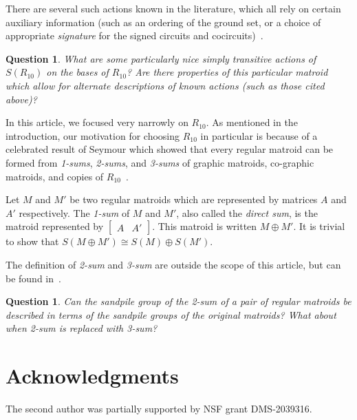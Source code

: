\documentclass[12p]{amsart}
\numberwithin{equation}{section}
\theoremstyle{plain}
\newtheorem{open}[thm]{Question}
\theoremstyle{definition}
\begin{document}
There are several such actions known in the literature, which all rely on certain auxiliary information (such as an ordering of the ground set, or a choice of appropriate \emph{signature} for the signed circuits and cocircuits)~\cite{GLV,BBY,BSY,Ding}. 

\begin{open}
    What are some particularly nice simply transitive actions of $S(R_{10})$ on the bases of $R_{10}$? Are there properties of this particular matroid which allow for alternate descriptions of known actions (such as those cited above)? 
\end{open}

In this article, we focused very narrowly on $R_{10}$. As mentioned in the introduction, our motivation for choosing $R_{10}$ in particular is because of a celebrated result of Seymour which showed that every regular matroid can be formed from \emph{1-sums}, \emph{2-sums}, and \emph{3-sums} of graphic matroids, co-graphic matroids, and copies of $R_{10}$~\cite{Seymour}.

Let $M$ and $M'$ be two regular matroids which are represented by matrices $A$ and $A'$ respectively. The \emph{1-sum} of $M$ and $M'$, also called the \emph{direct sum}, is the matroid represented by $\begin{bmatrix}A &  A'\end{bmatrix}$. This matroid is written $M \oplus M'$. It is trivial to show that $S(M \oplus M')\cong S(M) \oplus S(M')$. 

The definition of \emph{2-sum} and \emph{3-sum} are outside the scope of this article, but can be found in~\cite{Oxley}. 

\begin{open}
    Can the sandpile group of the 2-sum of a pair of regular matroids be described in terms of the sandpile groups of the original matroids? What about when 2-sum is replaced with 3-sum? 
\end{open}
\section*{Acknowledgments}
The second author was partially supported by NSF grant DMS-2039316.





\end{document}
